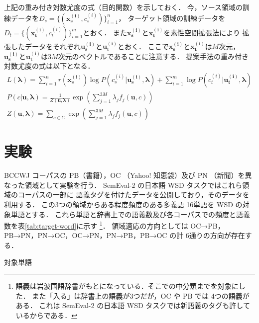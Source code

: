 \documentclass[japanese]{jnlp_1.4}
\begin{document}
上記の重み付き対数尤度の式（目的関数）を示しておく．
今，ソース領域の訓練データを\( D_s = \{ (\boldsymbol{x_s^{(i)}},c_s^{(i)}) \}_{i = 1}^n \)，
ターゲット領域の訓練データを\( D_t = \{ (\boldsymbol{x_t^{(i)}},c_t^{(i)}) \}_{i = 1}^m \)とおく．
また\( \boldsymbol{x_s^{(i)}} \)と\( \boldsymbol{x_t^{(i)}} \)を素性空間拡張法により
拡張したデータをそれぞれ\( \boldsymbol{u_s^{(i)}} \)と\( \boldsymbol{u_t^{(i)}} \)とおく．
ここで\( \boldsymbol{x_s^{(i)}} \)と\( \boldsymbol{x_t^{(i)}} \)は\( M \)次元，
\( \boldsymbol{u_s^{(i)}} \)と\( \boldsymbol{u_t^{(i)}} \)は\( 3M \)次元のベクトルであることに注意する．
提案手法の重み付き対数尤度の式は以下となる．
\begin{gather*}
L(\boldsymbol{\lambda}) = \sum_{i=1}^n r(\boldsymbol{x_s^{(i)}}) \log P(c_s^{(i)}|\boldsymbol{u_s^{(i)}},\boldsymbol{\lambda}) 
+ \sum_{i=1}^m \log P(c_t^{(i)}|\boldsymbol{u_t^{(i)}},\boldsymbol{\lambda})  \\
P(c|\boldsymbol{u},\boldsymbol{\lambda}) = \frac{1}{Z(\boldsymbol{u},\boldsymbol{\lambda})} \exp \left(
\sum_{j=1}^{3M} \lambda_j f_j(\boldsymbol{u},c)
\right) \\
Z(\boldsymbol{u},\boldsymbol{\lambda}) = \sum_{c \in C} \exp \left(
\sum_{j=1}^{3M} \lambda_j f_j(\boldsymbol{u},c) 
\right)
\end{gather*}





\section{実験}



BCCWJ コーパスの PB（書籍），OC （Yahoo! 知恵袋）及び PN （新聞）を異なった領域として実験を行う．
SemEval-2 の日本語 WSD タスク\cite{semeval-2010}ではこれら領域のコーパスの一部に
語義タグを付けたデータを公開しており，そのデータを利用する．
この3つの領域からある程度頻度のある多義語 16単語を WSD の対象単語とする．
これら単語と辞書上での語義数及び各コーパスでの頻度と語義数を\mbox{表\ref{tab:target-word}}に示す
\footnote{語義は岩波国語辞書がもとになっている．そこでの中分類までを対象にした．
また「入る」は辞書上の語義が3つだが，OC や PB では 4つの語義がある．
これは SemEval-2 の日本語 WSD タスクでは新語義のタグも許しているからである．}．
領域適応の方向としては OC→PB，PB→PN，PN→OC，OC→PN，PN→PB，PB→OC
の計 6通りの方向が存在する．

\begin{table}[t]
\caption{対象単語}
\label{tab:target-word}

\end{table}
\end{document}

